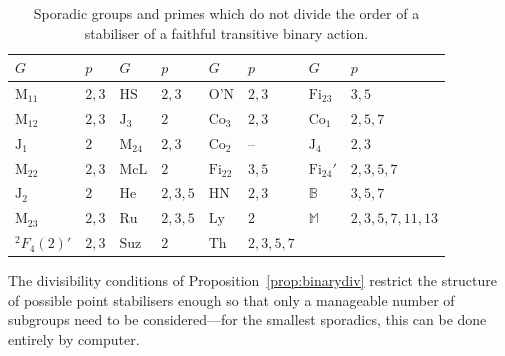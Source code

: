 \documentclass[11pt, a4paper]{amsart}
\begin{document}
\begin{table}[h]
    \centering
    \begin{tabular}{|ll|ll|ll|ll|}\hline
$G$            & $p$   & $G$       & $p$     & $G$        & $p$       & $G$         & $p$             \\ \hline
$\mathrm{M}_{11}$      & $2,3$ & $\mathrm{HS}$     & $2,3$   & $\mathrm{O\text{'}N}$      & $2,3$     & $\mathrm{Fi}_{23}$  & $3,5$           \\
$\mathrm{M}_{12}$      & $2,3$ & $\mathrm{J}_3$    & $2$     & $\mathrm{Co}_3$    & $2,3$     & $\mathrm{Co}_1$     & $2,5,7$         \\
$\mathrm{J}_1$         & $2$   & $\mathrm{M}_{24}$ & $2,3$   & $\mathrm{Co}_2$    & --        & $\mathrm{J}_4$      & $2,3$           \\
$\mathrm{M}_{22}$      & $2,3$ & $\mathrm{McL}$    & $2$     & $\mathrm{Fi}_{22}$ & $3,5$     & $\mathrm{Fi}_{24}'$ & $2,3,5,7$       \\
$\mathrm{J}_2$         & $2$   & $\mathrm{He}$     & $2,3,5$ & $\mathrm{HN}$      & $2,3$     & $\mathbb{B}$       & $3,5,7$         \\
$\mathrm{M}_{23}$      & $2,3$ & $\mathrm{Ru}$     & $2,3,5$ & $\mathrm{Ly}$      & $2$       & $\mathbb{M}$       & $2,3,5,7,11,13$ \\
${}^2F_4(2)'$ & $2,3$ & $\mathrm{Suz}$    & $2$     & $\mathrm{Th}$      & $2,3,5,7$ &             &   \\             \hline
\end{tabular}

    \caption{Sporadic groups and primes which do not divide the order of a stabiliser of a faithful transitive binary action.}
    \label{tbl:forbiddenpbinary}
\end{table}
The divisibility conditions of Proposition~\ref{prop:binarydiv} restrict the structure of possible point stabilisers enough so that only a manageable number of subgroups need to be considered---for the smallest sporadics, this can be done entirely by computer.






                                                
                                                                                    
         
      



    
\end{document}
